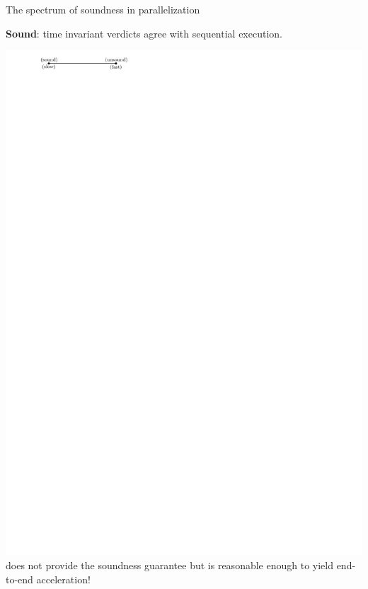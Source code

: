 \documentclass{beamer}
\begin{document}
\begin{frame}{The spectrum of soundness in parallelization}
	
{\textbf{\rsm Sound}: time invariant verdicts agree with sequential execution.}
\begin{center}
\includegraphics[width=0.8\linewidth,page=1]{images/spectrum.pdf}
\vfill
{\color{white}\tname{} does not provide the soundness guarantee but is reasonable enough to yield end-to-end acceleration!}
\end{center}
\end{frame}
\end{document}
